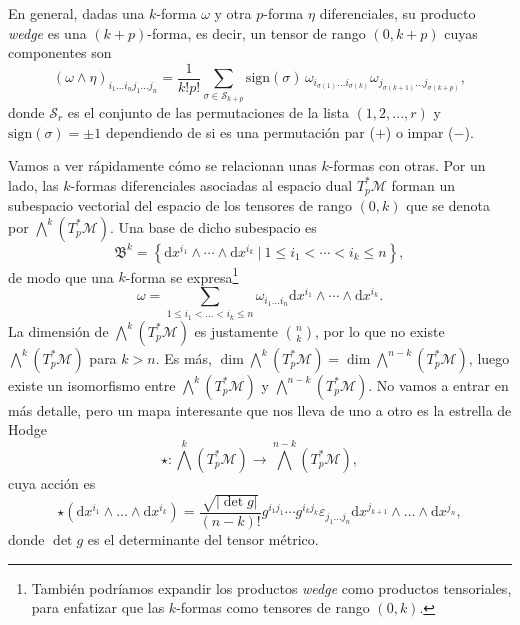 En general, dadas una \(k\)-forma \(\omega\) y otra \(p\)-forma \(\eta\) diferenciales, su producto \textit{wedge} es una \((k+p)\)-forma, es decir, un tensor de rango \((0, k+p)\) cuyas componentes son 
\begin{equation}
    (\omega\wedge\eta)_{i_1...i_{n}j_1...j_n} = \frac{1}{k!p!}\sum_{\sigma\in \mathcal{S}_{k+p}} \mathrm{sign}(\sigma)\, \omega_{i_{\sigma(1)}...i_{\sigma(k)}}
    \omega_{j_{\sigma(k+1)}...j_{\sigma(k+p)}},
\end{equation}
donde \(\mathcal{S}_r\) es el conjunto de las permutaciones de la lista \((1, 2, ..., r)\) y \(\mathrm{sign}(\sigma) = \pm 1\) dependiendo de si es una permutación par (\(+\)) o impar (\(-\)).

Vamos a ver rápidamente cómo se relacionan unas \(k\)-formas con otras. Por un lado, las \(k\)-formas diferenciales asociadas al espacio dual \(T_p^*\mathcal{M}\) forman un subespacio vectorial del espacio de los tensores de rango \((0, k)\) que se denota por \(\bigwedge^k(T_p^*\mathcal{M})\). Una base de dicho subespacio es 
\begin{equation}
    \mathfrak{B}^k = \left\{\mathrm{d}x^{i_1}\wedge\cdots\wedge\mathrm{d}x^{i_k}\ |\ 1\leq i_1<\cdots<i_k\leq n\right\},
\end{equation}
de modo que una \(k\)-forma se expresa\footnote{También podríamos expandir los productos \textit{wedge} como productos tensoriales, para enfatizar que las \(k\)-formas como tensores de rango \((0, k)\).} 
\begin{equation}
    \omega = \sum_{1\leq i_1<...<i_k\leq n} \omega_{i_1...i_n} \mathrm{d}x^{i_1}\wedge\cdots\wedge\mathrm{d}x^{i_k}.
\end{equation}
La dimensión de \(\bigwedge^k(T_p^*\mathcal{M})\) es justamente \(n\choose k\), por lo que no existe \(\bigwedge^k(T_p^*\mathcal{M})\) para \(k>n\). Es más, \(\dim \bigwedge^k(T_p^*\mathcal{M}) = \dim \bigwedge^{n-k}(T_p^*\mathcal{M})\), luego existe un isomorfismo entre \(\bigwedge^k(T_p^*\mathcal{M})\) y \(\bigwedge^{n-k}(T_p^*\mathcal{M})\). No vamos a entrar en más detalle, pero un mapa interesante que nos lleva de uno a otro es la estrella de Hodge
\begin{equation}
    \star: \textstyle{\bigwedge^k}(T_p^*\mathcal{M}) \rightarrow \textstyle{\bigwedge^{n-k}}(T_p^*\mathcal{M}),
\end{equation} 
cuya acción es 
\begin{equation}
    \star\left(\mathrm{d}x^{i_1} \wedge \dots \wedge \mathrm{d}x^{i_k}\right) = 
    \frac{\sqrt{\left|\det g\right|}}{(n-k)!} g^{i_1 j_1} \cdots g^{i_k j_k} \varepsilon_{j_1 \dots j_n} \mathrm{d}x^{j_{k+1}} \wedge \dots \wedge \mathrm{d}x^{j_n},
\end{equation}
donde \(\det g\) es el determinante del tensor métrico.

